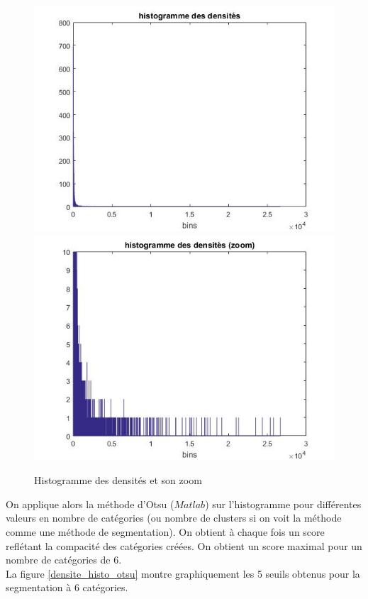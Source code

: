 \documentclass{book}
\begin{document}
\begin{figure}[H]
\begin{center}
\includegraphics[scale=0.5]{images/densite_histo.jpg}
\includegraphics[scale=0.5]{images/densite_histo_zoom.jpg}
\end{center}
\caption{Histogramme des densités et son zoom}
\label{densite_histo}
\end{figure}

On applique alors la méthode d'Otsu ($Matlab$) sur l'histogramme pour différentes valeurs en nombre de catégories (ou nombre de clusters si on voit la méthode comme
une méthode de segmentation). On obtient à chaque fois un score reflétant la compacité des catégories créées. On obtient un score maximal pour un nombre de catégories de 6.\\
La figure \ref{densite_histo_otsu} montre graphiquement les 5 seuils obtenus pour la segmentation  à 6 catégories.
\end{document}
